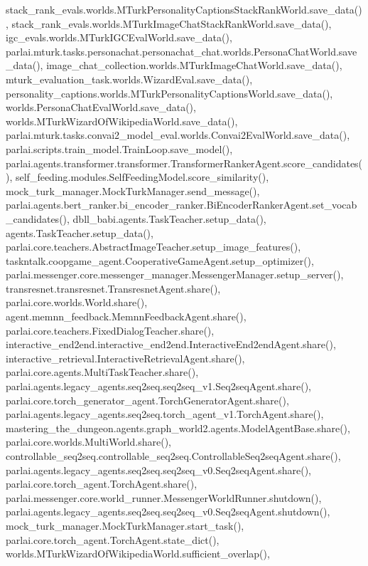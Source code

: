 stack\+\_\+rank\+\_\+evals.\+worlds.\+M\+Turk\+Personality\+Captions\+Stack\+Rank\+World.\+save\+\_\+data(), stack\+\_\+rank\+\_\+evals.\+worlds.\+M\+Turk\+Image\+Chat\+Stack\+Rank\+World.\+save\+\_\+data(), igc\+\_\+evals.\+worlds.\+M\+Turk\+I\+G\+C\+Eval\+World.\+save\+\_\+data(), parlai.\+mturk.\+tasks.\+personachat.\+personachat\+\_\+chat.\+worlds.\+Persona\+Chat\+World.\+save\+\_\+data(), image\+\_\+chat\+\_\+collection.\+worlds.\+M\+Turk\+Image\+Chat\+World.\+save\+\_\+data(), mturk\+\_\+evaluation\+\_\+task.\+worlds.\+Wizard\+Eval.\+save\+\_\+data(), personality\+\_\+captions.\+worlds.\+M\+Turk\+Personality\+Captions\+World.\+save\+\_\+data(), worlds.\+Persona\+Chat\+Eval\+World.\+save\+\_\+data(), worlds.\+M\+Turk\+Wizard\+Of\+Wikipedia\+World.\+save\+\_\+data(), parlai.\+mturk.\+tasks.\+convai2\+\_\+model\+\_\+eval.\+worlds.\+Convai2\+Eval\+World.\+save\+\_\+data(), parlai.\+scripts.\+train\+\_\+model.\+Train\+Loop.\+save\+\_\+model(), parlai.\+agents.\+transformer.\+transformer.\+Transformer\+Ranker\+Agent.\+score\+\_\+candidates(), self\+\_\+feeding.\+modules.\+Self\+Feeding\+Model.\+score\+\_\+similarity(), mock\+\_\+turk\+\_\+manager.\+Mock\+Turk\+Manager.\+send\+\_\+message(), parlai.\+agents.\+bert\+\_\+ranker.\+bi\+\_\+encoder\+\_\+ranker.\+Bi\+Encoder\+Ranker\+Agent.\+set\+\_\+vocab\+\_\+candidates(), dbll\+\_\+babi.\+agents.\+Task\+Teacher.\+setup\+\_\+data(), agents.\+Task\+Teacher.\+setup\+\_\+data(), parlai.\+core.\+teachers.\+Abstract\+Image\+Teacher.\+setup\+\_\+image\+\_\+features(), taskntalk.\+coopgame\+\_\+agent.\+Cooperative\+Game\+Agent.\+setup\+\_\+optimizer(), parlai.\+messenger.\+core.\+messenger\+\_\+manager.\+Messenger\+Manager.\+setup\+\_\+server(), transresnet.\+transresnet.\+Transresnet\+Agent.\+share(), parlai.\+core.\+worlds.\+World.\+share(), agent.\+memnn\+\_\+feedback.\+Memnn\+Feedback\+Agent.\+share(), parlai.\+core.\+teachers.\+Fixed\+Dialog\+Teacher.\+share(), interactive\+\_\+end2end.\+interactive\+\_\+end2end.\+Interactive\+End2end\+Agent.\+share(), interactive\+\_\+retrieval.\+Interactive\+Retrieval\+Agent.\+share(), parlai.\+core.\+agents.\+Multi\+Task\+Teacher.\+share(), parlai.\+agents.\+legacy\+\_\+agents.\+seq2seq.\+seq2seq\+\_\+v1.\+Seq2seq\+Agent.\+share(), parlai.\+core.\+torch\+\_\+generator\+\_\+agent.\+Torch\+Generator\+Agent.\+share(), parlai.\+agents.\+legacy\+\_\+agents.\+seq2seq.\+torch\+\_\+agent\+\_\+v1.\+Torch\+Agent.\+share(), mastering\+\_\+the\+\_\+dungeon.\+agents.\+graph\+\_\+world2.\+agents.\+Model\+Agent\+Base.\+share(), parlai.\+core.\+worlds.\+Multi\+World.\+share(), controllable\+\_\+seq2seq.\+controllable\+\_\+seq2seq.\+Controllable\+Seq2seq\+Agent.\+share(), parlai.\+agents.\+legacy\+\_\+agents.\+seq2seq.\+seq2seq\+\_\+v0.\+Seq2seq\+Agent.\+share(), parlai.\+core.\+torch\+\_\+agent.\+Torch\+Agent.\+share(), parlai.\+messenger.\+core.\+world\+\_\+runner.\+Messenger\+World\+Runner.\+shutdown(), parlai.\+agents.\+legacy\+\_\+agents.\+seq2seq.\+seq2seq\+\_\+v0.\+Seq2seq\+Agent.\+shutdown(), mock\+\_\+turk\+\_\+manager.\+Mock\+Turk\+Manager.\+start\+\_\+task(), parlai.\+core.\+torch\+\_\+agent.\+Torch\+Agent.\+state\+\_\+dict(), worlds.\+M\+Turk\+Wizard\+Of\+Wikipedia\+World.\+sufficient\+\_\+overlap(), 